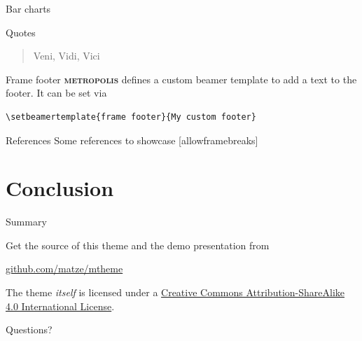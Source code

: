 \documentclass[10pt]{beamer}
\newcommand{\themename}{\textbf{\textsc{metropolis}}\xspace}
\begin{document}
\begin{frame}{Bar charts}
  \begin{figure}
  \end{figure}
\end{frame}
\begin{frame}{Quotes}
  \begin{quote}
    Veni, Vidi, Vici
  \end{quote}
\end{frame}

{%
\begin{frame}[fragile]{Frame footer}
    \themename defines a custom beamer template to add a text to the footer. It can be set via
    \begin{verbatim}\setbeamertemplate{frame footer}{My custom footer}\end{verbatim}
\end{frame}
}

\begin{frame}{References}
  Some references to showcase [allowframebreaks] \cite{knuth92,ConcreteMath,Simpson,Er01,greenwade93}
\end{frame}

\section{Conclusion}

\begin{frame}{Summary}

  Get the source of this theme and the demo presentation from

  \begin{center}\url{github.com/matze/mtheme}\end{center}

  The theme \emph{itself} is licensed under a
  \href{http://creativecommons.org/licenses/by-sa/4.0/}{Creative Commons
  Attribution-ShareAlike 4.0 International License}.

  \begin{center}\ccbysa\end{center}

\end{frame}

{
\begin{frame}[standout]
  Questions?
\end{frame}
}
\end{document}
